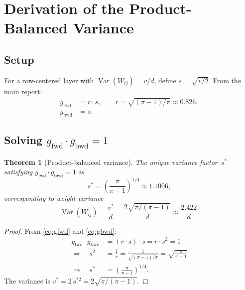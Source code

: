 \documentclass[11pt,a4paper]{article}
\newtheorem{theorem}{Theorem}[section]
\theoremstyle{definition}
\newcommand{\Var}{\operatorname{Var}}
\begin{document}
\section{Derivation of the Product-Balanced Variance}
\label{sec:derivation}

\subsection{Setup}

For a row-centered layer with $\Var(W_{ij}) = v/d$, define $s = \sqrt{v/2}$.
From the main report:
\begin{align}
  g_{\mathrm{fwd}} &= r \cdot s, \qquad r = \sqrt{(\pi-1)/\pi} \approx 0.826, \label{eq:gfwd} \\
  g_{\mathrm{bwd}} &= s. \label{eq:gbwd}
\end{align}

\subsection{Solving $g_{\mathrm{fwd}} \cdot g_{\mathrm{bwd}} = 1$}

\begin{theorem}[Product-balanced variance]
  \label{thm:product-balanced}
  The unique variance factor~$s^{\ast}$ satisfying
  $g_{\mathrm{fwd}} \cdot g_{\mathrm{bwd}} = 1$ is
  \begin{equation}\label{eq:s-star}
    s^{\ast} = \left(\frac{\pi}{\pi-1}\right)^{\!1/4} \approx 1.1006,
  \end{equation}
  corresponding to weight variance
  \begin{equation}\label{eq:v-star}
    \boxed{\;\Var(W_{ij}) = \frac{v^{\ast}}{d} = \frac{2\sqrt{\pi/(\pi-1)}}{d} \approx \frac{2.422}{d}.\;}
  \end{equation}
\end{theorem}

\begin{proof}
  From \eqref{eq:gfwd} and \eqref{eq:gbwd}:
  \begin{align*}
    g_{\mathrm{fwd}} \cdot g_{\mathrm{bwd}} &= (r \cdot s) \cdot s = r \cdot s^2 = 1 \\
    \Longrightarrow \quad s^2 &= \frac{1}{r} = \frac{1}{\sqrt{(\pi-1)/\pi}} = \sqrt{\frac{\pi}{\pi-1}} \\
    \Longrightarrow \quad s^{\ast} &= \left(\frac{\pi}{\pi-1}\right)^{\!1/4}.
  \end{align*}
  The variance is $v^{\ast} = 2\,s^{\ast 2} = 2\sqrt{\pi/(\pi-1)}$.
\end{proof}
\end{document}
